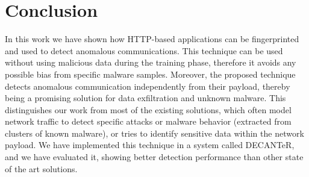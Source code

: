 \section{Conclusion}

In this work we have shown how HTTP-based applications can be fingerprinted and used to detect anomalous communications. This technique can be used without using malicious data during the training phase, therefore it avoids any possible bias from specific malware samples. Moreover, the proposed technique detects anomalous communication independently from their payload, thereby being a promising solution for data exfiltration and unknown malware. This distinguishes our work from most of the existing solutions, which often model network traffic to detect specific attacks or malware behavior (extracted from clusters of known malware), or tries to identify sensitive data within the network payload. We have implemented this technique in a system called DECANTeR, and we have evaluated it, showing better detection performance than other state of the art solutions.
